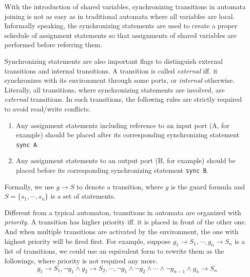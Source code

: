 With the introduction of shared variables, synchronizing transitions in automata joining is not as easy as in traditional automata where all variables are local. Informally speaking, the synchronizing statements are used to create a proper schedule of assignment statements so that assignments of shared variables are performed before referring them.

Synchronizing statements are also important flags to distinguish external transitions and internal transitions. A transition is called \emph{external} iff. it synchronizes with its environment through some ports, or \emph{internal} otherwise. Literally, all transitions, where synchronizing statements are involved, are \emph{external} transitions. In such transitions, the following rules are strictly required to avoid read/write conflicts.

\begin{enumerate}
    \item Any assignment statements including reference to an input port (A, for example) should be placed after its corresponding synchronizing statement \texttt{sync A}.
    \item Any assignment statements to an output port (B, for example) should be placed before its corresponding synchronizing statement \texttt{sync B}.
\end{enumerate}

\begin{formalization}[Transitions]
Formally, we use $g\rightarrow S$ to denote a transition, where $g$ is the guard formula and $S=\{s_1,\cdots,s_n\}$ is a set of statements. 
\end{formalization}
Different from a typical automaton, transitions in \lang{} automata are organized with \emph{priority}. A transition has higher priority iff. it is placed in front of the other one. And when multiple transitions are activated by the environment, the one with highest priority will be fired first. For example, suppose $g_1\rightarrow S_1,\cdots,g_n\rightarrow S_n$ is a list of transitions, we could use an equivalent form to rewrite them as the followings, where priority is not required any more.
\[
    g_1\rightarrow S_1, \lnot g_1\land g_2\rightarrow S_2,\cdots,\lnot g_1\land \lnot g_2\land\cdots\land \lnot g_{n-1} \land g_n\rightarrow S_n
\]

